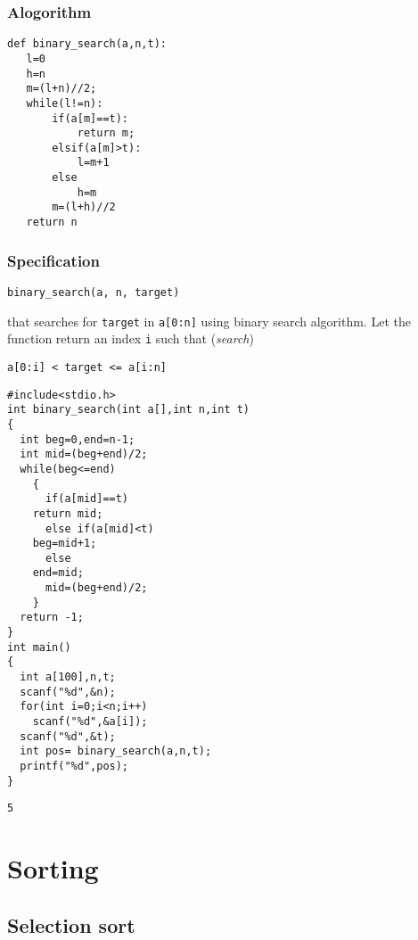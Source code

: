 \documentclass[11pt]{article}
\begin{document}
\subsubsection*{Alogorithm}
\label{sec-1-2-1}
\begin{verbatim}
def binary_search(a,n,t):
   l=0
   h=n
   m=(l+n)//2;
   while(l!=n):
       if(a[m]==t):
           return m;
       elsif(a[m]>t):
           l=m+1
       else
           h=m
       m=(l+h)//2
   return n
\end{verbatim}
\subsubsection*{Specification}
\label{sec-1-2-2}
\linespread{1}
\begin{verbatim}
binary_search(a, n, target)
\end{verbatim}
\linespread{1.2}
that searches for \texttt{target} in \texttt{a[0:n]} using binary search
algorithm. Let the function return an index \texttt{i} such that \hfill
(\emph{search})
\begin{verbatim}
a[0:i] < target <= a[i:n]
\end{verbatim}
\begin{verbatim}
#include<stdio.h>
int binary_search(int a[],int n,int t)
{
  int beg=0,end=n-1;
  int mid=(beg+end)/2;
  while(beg<=end)
    {
      if(a[mid]==t)
	return mid;
      else if(a[mid]<t)
	beg=mid+1;
      else 
	end=mid;
      mid=(beg+end)/2;
    }
  return -1;
}
int main()
{
  int a[100],n,t;
  scanf("%d",&n);
  for(int i=0;i<n;i++)
    scanf("%d",&a[i]);
  scanf("%d",&t);
  int pos= binary_search(a,n,t);
  printf("%d",pos);
}
\end{verbatim}

\begin{verbatim}
5
\end{verbatim}

\section{Sorting}
\label{sec-2}
\subsection*{Selection sort}
\label{sec-2-1}
\end{document}
